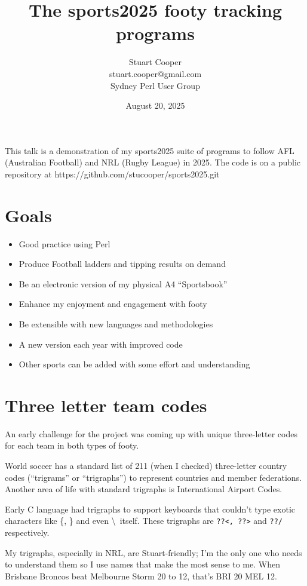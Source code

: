 \documentclass{article}
\title{The sports2025 footy tracking programs}
\author{Stuart Cooper\\stuart.cooper@gmail.com\\Sydney Perl User Group}
\date{August 20, 2025}
\begin{document}
\maketitle

This talk is a demonstration of my sports2025 suite of programs to
follow AFL (Australian Football) and NRL (Rugby League) in 2025.
The code is on a public repository at
https://github.com/stucooper/sports2025.git

\section{Goals}

\begin{itemize}
  \item Good practice using Perl
  \item Produce Football ladders and tipping results on demand
  \item Be an electronic version of my physical A4 ``Sportsbook''
  \item Enhance my enjoyment and engagement with footy
  \item Be extensible with new languages and methodologies
  \item A new version each year with improved code
  \item Other sports can be added with some effort and understanding
\end{itemize}

\section{Three letter team codes}

An early challenge for the project was coming up with unique
three-letter codes for each team in both types of footy.

World soccer has a standard list of 211 (when I checked) three-letter
country codes (``trigrams'' or ``trigraphs'') to represent countries
and member federations. Another area of life with standard trigraphs
is International Airport Codes.

Early C language had trigraphs to support keyboards that couldn't type
exotic characters like \{, \} and even \textbackslash\ itself. These
trigraphs are \verb!??<, ??>! and \verb!??/! respectively.

My trigraphs, especially in NRL, are Stuart-friendly; I'm the only one
who needs to understand them so I use names that make the most sense
to me. When Brisbane Broncos beat Melbourne Storm 20 to 12, that's BRI
20 MEL 12.
\end{document}
